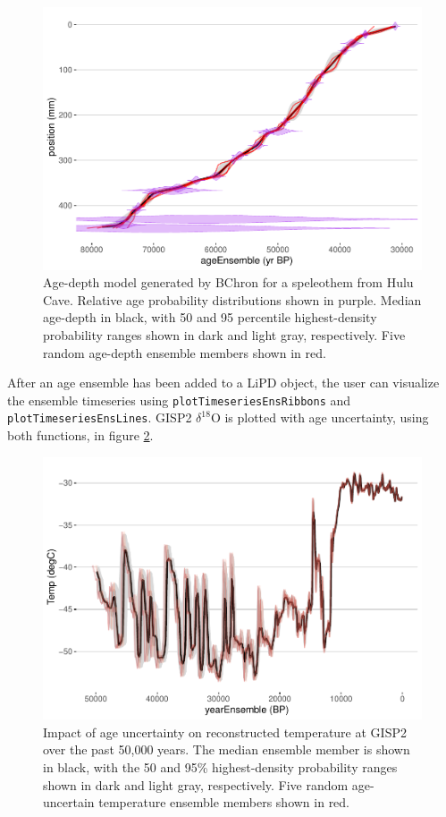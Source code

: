 \documentclass[gchron, manuscript]{copernicus}
\begin{document}
\begin{figure}
\includegraphics[width=12cm]{geoChronR-paper_files/figure-latex/age-model-1} \caption{Age-depth model generated by BChron for a speleothem from Hulu Cave. Relative age probability distributions shown in purple. Median age-depth in black, with 50 and 95 percentile highest-density probability ranges shown in dark and light gray, respectively. Five random age-depth ensemble members shown in red.}\label{fig:age-model}
\end{figure}

After an age ensemble has been added to a LiPD object, the user can visualize the ensemble timeseries using \texttt{plotTimeseriesEnsRibbons} and \texttt{plotTimeseriesEnsLines}.
GISP2 \(\delta^{18}\)O is plotted with age uncertainty, using both functions, in figure \ref{fig:timeseries}.

\begin{figure}
\includegraphics[width=12cm]{geoChronR-paper_files/figure-latex/timeseries-1} \caption{Impact of age uncertainty on reconstructed temperature at GISP2 over the past 50,000 years. The median ensemble member is shown in black, with the 50 and 95\% highest-density probability ranges shown in dark and light gray, respectively. Five random age-uncertain temperature ensemble members shown in red.}\label{fig:timeseries}
\end{figure}
\end{document}
